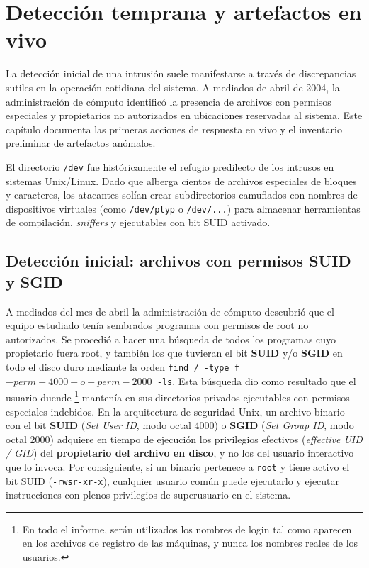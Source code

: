\chapter{Detección temprana y artefactos en vivo}

La detección inicial de una intrusión suele manifestarse a través de discrepancias sutiles en la operación cotidiana del sistema. A mediados de abril de 2004, la administración de cómputo identificó la presencia de archivos con permisos especiales y propietarios no autorizados en ubicaciones reservadas al sistema. Este capítulo documenta las primeras acciones de respuesta en vivo y el inventario preliminar de artefactos anómalos.

\begin{notaforense}
El directorio \texttt{/dev} fue históricamente el refugio predilecto de los intrusos en sistemas Unix/Linux. Dado que alberga cientos de archivos especiales de bloques y caracteres, los atacantes solían crear subdirectorios camuflados con nombres de dispositivos virtuales (como \texttt{/dev/ptyp} o \texttt{/dev/...}) para almacenar herramientas de compilación, \textit{sniffers} y ejecutables con bit SUID activado.
\end{notaforense}

\section{Detección inicial: archivos con permisos SUID y SGID}

A mediados del mes de abril la administración de cómputo descubrió
que el equipo estudiado tenía sembrados programas con permisos de
root no autorizados. Se procedió a hacer una búsqueda de todos los
programas cuyo propietario fuera root, y también los que tuvieran el
bit \textbf{SUID} y/o \textbf{SGID} en todo el disco duro mediante la orden \texttt{find / -type f \( -perm -4000 -o -perm -2000 \) -ls}. Esta búsqueda
dio como resultado que el usuario duende \footnote{En todo el
informe, serán utilizados los nombres de login tal como aparecen en
los archivos de registro de las máquinas, y nunca los nombres reales
de los usuarios.} mantenía en sus directorios privados ejecutables con permisos especiales indebidos. En la arquitectura de seguridad Unix, un archivo binario con el bit \textbf{SUID} (\textit{Set User ID}, modo octal 4000) o \textbf{SGID} (\textit{Set Group ID}, modo octal 2000) adquiere en tiempo de ejecución los privilegios efectivos (\textit{effective UID / GID}) del \textbf{propietario del archivo en disco}, y no los del usuario interactivo que lo invoca. Por consiguiente, si un binario pertenece a \texttt{root} y tiene activo el bit SUID (\texttt{-rwsr-xr-x}), cualquier usuario común puede ejecutarlo y ejecutar instrucciones con plenos privilegios de superusuario en el sistema.

